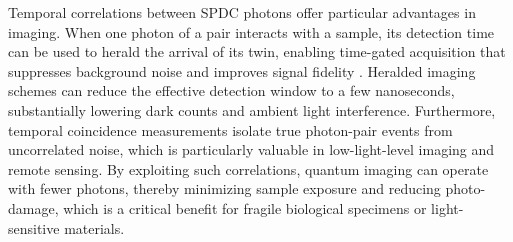 Temporal correlations between SPDC photons offer particular advantages in imaging. When one photon of a pair interacts with a sample, its detection time can be used to herald the arrival of its twin, enabling time-gated acquisition that suppresses background noise and improves signal fidelity \cite{moreauImagingQuantumStates2019}. Heralded imaging schemes can reduce the effective detection window to a few nanoseconds, substantially lowering dark counts and ambient light interference. Furthermore, temporal coincidence measurements isolate true photon-pair events from uncorrelated noise, which is particularly valuable in low-light-level imaging and remote sensing. By exploiting such correlations, quantum imaging can operate with fewer photons, thereby minimizing sample exposure and reducing photo-damage, which is a critical benefit for fragile biological specimens or light-sensitive materials.






